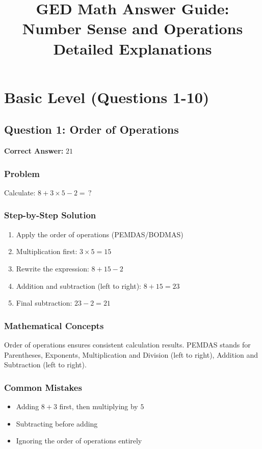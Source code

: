 \documentclass[12pt,a4paper]{article}
\title{\textbf{GED Math Answer Guide:\\Number Sense and Operations}\\[0.5cm]{\large Detailed Explanations}}
\author{}
\date{}
\begin{document}
\maketitle
\thispagestyle{empty}
\newpage

\tableofcontents
\newpage

\section{Basic Level (Questions 1-10)}

\subsection*{Question 1: Order of Operations}

\textbf{Correct Answer:} $21$

\subsubsection*{Problem}
Calculate: $8 + 3 \times 5 - 2 = \,?$

\subsubsection*{Step-by-Step Solution}
\begin{enumerate}
    \item Apply the order of operations (PEMDAS/BODMAS)
    \item Multiplication first: $3 \times 5 = 15$
    \item Rewrite the expression: $8 + 15 - 2$
    \item Addition and subtraction (left to right): $8 + 15 = 23$
    \item Final subtraction: $23 - 2 = 21$
\end{enumerate}

\subsubsection*{Mathematical Concepts}
Order of operations ensures consistent calculation results. PEMDAS stands for Parentheses, Exponents, Multiplication and Division (left to right), Addition and Subtraction (left to right).

\subsubsection*{Common Mistakes}
\begin{itemize}
    \item Adding $8 + 3$ first, then multiplying by $5$
    \item Subtracting before adding
    \item Ignoring the order of operations entirely
\end{itemize}
\end{document}
